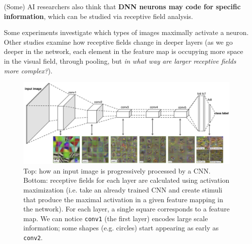 (Some) AI researchers also think that \textbf{DNN neurons may code for specific information}, which can be studied via receptive field analysis.

Some experiments investigate which types of images maximally activate a neuron. Other studies examine how receptive fields change in deeper layers (as we go deeper in the network, each element in the feature map is occupying more space in the visual field, through pooling, but \textit{in what way are larger receptive fields more complex?}).
\begin{figure}
    \centering
    \captionsetup{width=.8\linewidth}
    \includegraphics[width=1\linewidth]{images/dnn_receptive_fields.png}
    \caption{Top: how an input image is progressively processed by a CNN. Bottom: receptive fields for each layer are calculated using activation maximization (i.e. take an already trained CNN and create stimuli that produce the maximal activation in a given feature mapping in the network). For each layer, a single square corresponds to a feature map. We can notice \texttt{conv1} (the first layer) encodes large scale information; some shapes (e.g. circles) start appearing as early as \texttt{conv2}.}
\end{figure}

